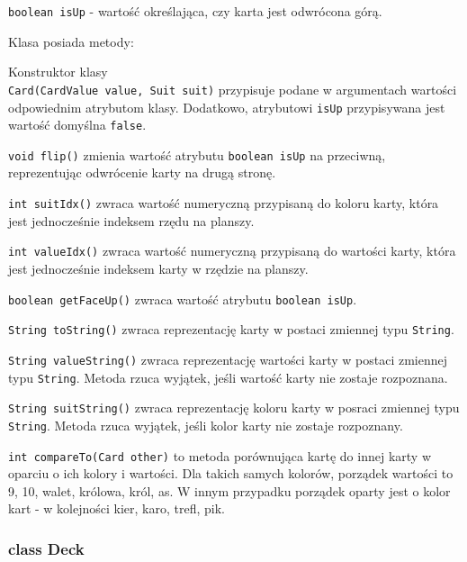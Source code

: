 \documentclass{article}
\begin{document}
\texttt{boolean isUp} - wartość określająca, czy karta jest odwrócona górą.

Klasa posiada metody:

Konstruktor klasy\\\texttt{Card(CardValue value, Suit suit)} przypisuje podane w argumentach wartości odpowiednim atrybutom klasy. Dodatkowo, atrybutowi \texttt{isUp} przypisywana jest wartość domyślna \texttt{false}.

\texttt{void flip()} zmienia wartość atrybutu \texttt{boolean isUp} na przeciwną, reprezentując odwrócenie karty na drugą stronę.

\texttt{int suitIdx()} zwraca wartość numeryczną przypisaną do koloru karty, która jest jednocześnie indeksem rzędu na planszy.

\texttt{int valueIdx()} zwraca wartość numeryczną przypisaną do wartości karty, która jest jednocześnie indeksem karty w rzędzie na planszy.

\texttt{boolean getFaceUp()} zwraca wartość atrybutu \texttt{boolean isUp}.

\texttt{String toString()} zwraca reprezentację karty w postaci zmiennej typu \texttt{String}.

\texttt{String valueString()} zwraca reprezentację wartości karty w postaci zmiennej typu \texttt{String}. Metoda rzuca wyjątek, jeśli wartość karty nie zostaje rozpoznana.

\texttt{String suitString()} zwraca reprezentację koloru karty w posraci zmiennej typu \texttt{String}. Metoda rzuca wyjątek, jeśli kolor karty nie zostaje rozpoznany.

\texttt{int compareTo(Card other)} to metoda porównująca  kartę do innej karty w oparciu o ich kolory i wartości. Dla takich samych kolorów, porządek wartości to 9, 10, walet, królowa, król, as. W innym przypadku porządek oparty jest o kolor kart - w kolejności kier, karo, trefl, pik.

\subsubsection*{class Deck}

\begin{center}
\end{center}
\end{document}
